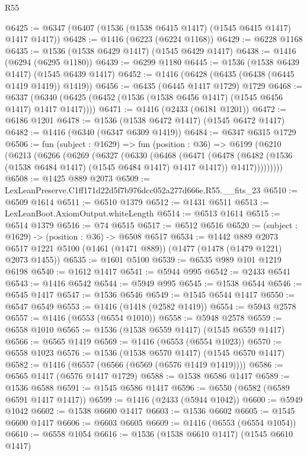 \begin{lexlean}{R55}
\begin{coremodule}
{{@6425 := @6347 (@6407 (@1536 (@1538 @6415 @1417) (@1545 @6415 @1417) @1417 @1417))
@6428 := @1416 (@6223 (@6224 @1168))
@6429 := @6228 @1168
@6435 := @1536 (@1538 @6429 @1417) (@1545 @6429 @1417)
@6438 := @1416 (@6294 (@6295 @1180))
@6439 := @6299 @1180
@6445 := @1536 (@1538 @6439 @1417) (@1545 @6439 @1417)
@6452 := @1416 (@6428 (@6435 (@6438 (@6445 @1419 @1419)) @1419))
@6456 := @6435 (@6445 @1417 @1729) @1729
@6468 := @6337 (@6340 (@6425 (@6452 (@1536 (@1538 @6456 @1417) (@1545 @6456 @1417) @1417 @1417))))
@6471 := @1416 (@2433 (@6181 @1201))
@6472 := @6186 @1201
@6478 := @1536 (@1538 @6472 @1417) (@1545 @6472 @1417)
@6482 := @1416 (@6340 (@6347 @6309 @1419))
@6484 := @6347 @6315 @1729
@6506 := fun (subject : @1629) =>
  fun (position : @36) =>
  @6199
    (@6210
      (@6213
        (@6266
          (@6269
            (@6327
              (@6330
                (@6468
                  (@6471
                    (@6478
                      (@6482 (@1536 (@1538 @6484 @1417) (@1545 @6484 @1417) @1417 @1417))
                      @1417)))))))))
@6508 := @1425 @889 @2073
@6509 := LexLeanPreserve.C1ff171d22d5f7b976dcc052a277d666e.R55.__fits_23
@6510 := @6509 @1614
@6511 := @6510 @1379
@6512 := @1431 @6511
@6513 := LexLeanBoot.AxiomOutput.whiteLength
@6514 := @6513 @1614
@6515 := @6514 @1379
@6516 := @74 @6515
@6517 := @6512 @6516
@6520 := (subject : @1629) -> (position : @36) -> @6508 @6517
@6534 := @1442
    @889
    @2073
    @6517
    @1221
    @5100
    (@1461 (@1471 @889))
    (@1477 (@1478 (@1479 @1221) @2073 @1455))
@6535 := @1601 @5100
@6539 := @6535 @989 @101 @1219 @6198
@6540 := @1612 @1417
@6541 := @5944 @995
@6542 := @2433 @6541
@6543 := @1416 @6542
@6544 := @5949 @995
@6545 := @1538 @6544
@6546 := @6545 @1417
@6547 := @1536 @6546
@6549 := @1545 @6544 @1417
@6550 := @6547 @6549
@6553 := @1416 (@1418 (@2582 @1419))
@6554 := @5943 @2578
@6557 := @1416 (@6553 (@6554 @1010))
@6558 := @5948 @2578
@6559 := @6558 @1010
@6565 := @1536 (@1538 @6559 @1417) (@1545 @6559 @1417)
@6566 := @6565 @1419
@6569 := @1416 (@6553 (@6554 @1023))
@6570 := @6558 @1023
@6576 := @1536 (@1538 @6570 @1417) (@1545 @6570 @1417)
@6582 := @1416 (@6557 (@6566 (@6569 (@6576 @1419 @1419))))
@6586 := @6565 @1417 (@6576 @1417 @1729)
@6588 := @1538 @6586 @1417
@6589 := @1536 @6588
@6591 := @1545 @6586 @1417
@6596 := @6550 (@6582 (@6589 @6591 @1417 @1417))
@6599 := @1416 (@2433 (@5944 @1042))
@6600 := @5949 @1042
@6602 := @1538 @6600 @1417
@6603 := @1536 @6602
@6605 := @1545 @6600 @1417
@6606 := @6603 @6605
@6609 := @1416 (@6553 (@6554 @1054))
@6610 := @6558 @1054
@6616 := @1536 (@1538 @6610 @1417) (@1545 @6610 @1417)
}}
\end{coremodule}
\end{lexlean}
